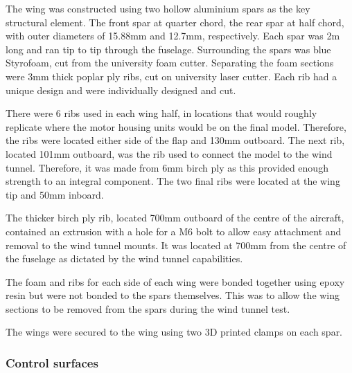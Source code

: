 \documentclass[../../main.tex]{subfiles}
\begin{document}
The wing was constructed using two hollow aluminium spars as the key structural element.
The front spar at quarter chord, the rear spar at half chord, with outer diameters of 15.88mm and 12.7mm, respectively.
Each spar was 2m long and ran tip to tip through the fuselage.
Surrounding the spars was blue Styrofoam, cut from the university foam cutter.
Separating the foam sections were 3mm thick poplar ply ribs, cut on university laser cutter.
Each rib had a unique design and were individually designed and cut.


There were 6 ribs used in each wing half, in locations that would roughly replicate where the motor housing units would be on the final model.
Therefore, the ribs were located either side of the flap and 130mm outboard.
The next rib, located 101mm outboard, was the rib used to connect the model to the wind tunnel.
Therefore, it was made from 6mm birch ply as this provided enough strength to an integral component.
The two final ribs were located at the wing tip and 50mm inboard.


The thicker birch ply rib, located 700mm outboard of the centre of the aircraft, contained an extrusion with a hole for a M6 bolt to allow easy attachment and removal to the wind tunnel mounts.
It was located at 700mm from the centre of the fuselage as dictated by the wind tunnel capabilities. 

The foam and ribs for each side of each wing were bonded together using epoxy resin but were not bonded to the spars themselves.
This was to allow the wing sections to be removed from the spars during the wind tunnel test. 

The wings were secured to the wing using two 3D printed clamps on each spar. 


\subsubsection{Control surfaces} \label{sec:design-process:interim-design-review:wind-tunnel-test:control-surfaces}
\end{document}
